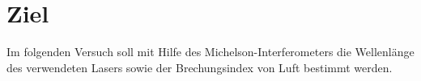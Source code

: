 \section{Ziel}
\label{sec:Ziel}

Im folgenden Versuch soll mit Hilfe des Michelson-Interferometers die Wellenlänge des verwendeten Lasers sowie der Brechungsindex von Luft bestimmt werden.